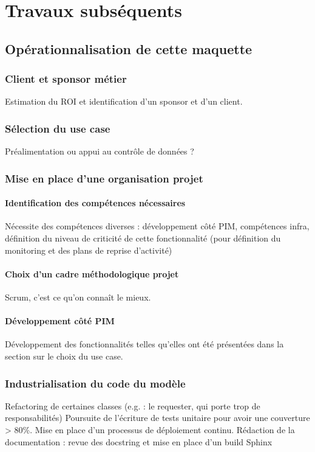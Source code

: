 \part{Travaux subséquents}
    \chapter{Opérationnalisation de cette maquette}    
        \section{Client et sponsor métier}
        Estimation du ROI et identification d'un sponsor et d'un client.

        \section{Sélection du use case}
        Préalimentation ou appui au contrôle de données ?

        \section{Mise en place d'une organisation projet}
            \subsection{Identification des compétences nécessaires}
            Nécessite des compétences diverses : développement côté PIM, compétences infra, définition du niveau de criticité de cette fonctionnalité (pour définition du monitoring et des plans de reprise d'activité)
            \subsection{Choix d'un cadre méthodologique projet}
            Scrum, c'est ce qu'on connaît le mieux.
            \subsection{Développement côté PIM}
            Développement des fonctionnalités telles qu'elles ont été présentées dans la section sur le choix du use case.

        \section{Industrialisation du code du modèle}
        Refactoring de certaines classes (e.g. : le requester, qui porte trop de responsabilités)
        Poursuite de l'écriture de tests unitaire pour avoir une couverture > 80\%.
        Mise en place d'un processus de déploiement continu.
        Rédaction de la documentation : revue des docstring et mise en place d'un build Sphinx

